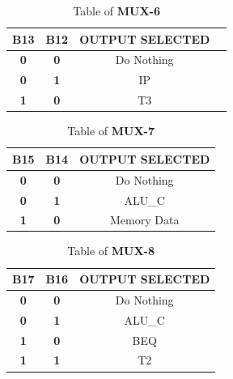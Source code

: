 \documentclass{article}
\begin{document}
\begin{table}[htb]
\centering
\begin{tabular}{|c|c|c|c|}
\hline
\rowcolor[HTML]{FFFC9E} 
\textbf{B13}                      & \textbf{B12}                      & \textbf{OUTPUT   SELECTED}        \\ \hline
{\color[HTML]{680100} \textbf{0}} & {\color[HTML]{680100} \textbf{0}} & {\color[HTML]{013300} Do Nothing} \\ \hline
{\color[HTML]{680100} \textbf{0}} & {\color[HTML]{680100} \textbf{1}} & {\color[HTML]{013300} IP}         \\ \hline
{\color[HTML]{680100} \textbf{1}} & {\color[HTML]{680100} \textbf{0}} & {\color[HTML]{013300} T3}         \\ \hline
\end{tabular}
\caption{Table of \textbf{MUX-6}}
\end{table}

\begin{table}[htb]
\centering
\begin{tabular}{|c|c|c|}
\hline
\rowcolor[HTML]{FFFC9E} 
\textbf{B15}                      & \textbf{B14}                      & \textbf{OUTPUT   SELECTED}           \\ \hline
{\color[HTML]{680100} \textbf{0}} & {\color[HTML]{680100} \textbf{0}} & {\color[HTML]{013300} Do Nothing}    \\ \hline
{\color[HTML]{680100} \textbf{0}} & {\color[HTML]{680100} \textbf{1}} & {\color[HTML]{013300} ALU\_C}        \\ \hline
{\color[HTML]{680100} \textbf{1}} & {\color[HTML]{680100} \textbf{0}} & {\color[HTML]{013300} Memory   Data} \\ \hline
\end{tabular}
\caption{Table of \textbf{MUX-7}}
\end{table}

\begin{table}[htb]
\centering
\begin{tabular}{|c|c|c|}
\hline
\rowcolor[HTML]{FFFC9E} 
\textbf{B17}                      & \textbf{B16}                      & \textbf{OUTPUT   SELECTED}        \\ \hline
{\color[HTML]{680100} \textbf{0}} & {\color[HTML]{680100} \textbf{0}} & {\color[HTML]{013300} Do Nothing} \\ \hline
{\color[HTML]{680100} \textbf{0}} & {\color[HTML]{680100} \textbf{1}} & {\color[HTML]{013300} ALU\_C}     \\ \hline
{\color[HTML]{680100} \textbf{1}} & {\color[HTML]{680100} \textbf{0}} & {\color[HTML]{013300} BEQ}        \\ \hline
{\color[HTML]{680100} \textbf{1}} & {\color[HTML]{680100} \textbf{1}} & {\color[HTML]{013300} T2}         \\ \hline
\end{tabular}
\caption{Table of \textbf{MUX-8}}
\end{table}
\end{document}
